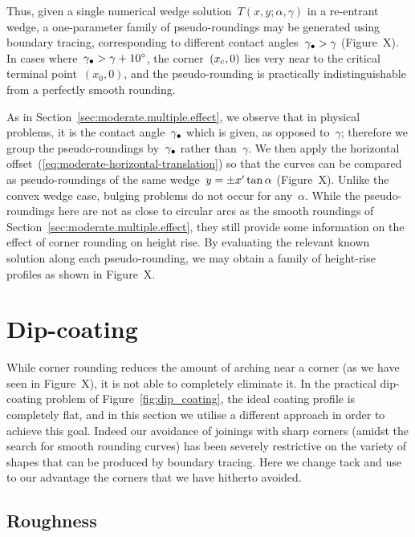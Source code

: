 Thus, given a single numerical wedge solution~$T (x, y; \alpha, \gamma)$
in a re-entrant wedge,
a one-parameter family of pseudo-roundings may be generated
using boundary tracing,
corresponding to different contact angles~$\gamma_\bullet > \gamma$
(Figure~X). %
In cases where~$\gamma_\bullet > \gamma + \SI{10}{\degree}$,
the corner~$(x_{\mathrm{c}}, 0)$ lies very near
to the critical terminal point~$(x_0, 0)$,
and the pseudo-rounding is practically indistinguishable
from a perfectly smooth rounding.

As in Section~\ref{sec:moderate.multiple.effect},
we observe that in physical problems,
it is the contact angle~$\gamma_\bullet$ which is given,
as opposed to~$\gamma$;
therefore we group the pseudo-roundings by~$\gamma_\bullet$
rather than~$\gamma$.
We then apply the horizontal offset~(\ref{eq:moderate-horizontal-translation})
so that the curves can be compared as pseudo-roundings
of the same wedge~$y = \pm x' \tan\alpha$
(Figure~X). %
Unlike the convex wedge case,
bulging problems do not occur for any~$\alpha$.
While the pseudo-roundings here are not as close to circular arcs
as the smooth roundings of Section~\ref{sec:moderate.multiple.effect},
they still provide some information
on the effect of corner rounding on height rise.
By evaluating the relevant known solution
along each pseudo-rounding,
we may obtain a family of height-rise profiles
as shown in Figure~X. %

\section{Dip-coating}
\label{sec:re-entrant.dip-coating}

While corner rounding reduces the amount of arching near a corner
(as we have seen in Figure~X), %
it is not able to completely eliminate it.
In the practical dip-coating problem of
Figure~\ref{fig:dip_coating},
the ideal coating profile is completely flat,
and in this section we utilise a different approach
in order to achieve this goal.
Indeed our avoidance of joinings with sharp corners
(amidst the search for smooth rounding curves)
has been severely restrictive
on the variety of shapes that can be produced by boundary tracing.
Here we change tack and use to our advantage
the corners that we have hitherto avoided.

\subsection{Roughness}
\label{sec:re-entrant.dip-coating.roughness}

